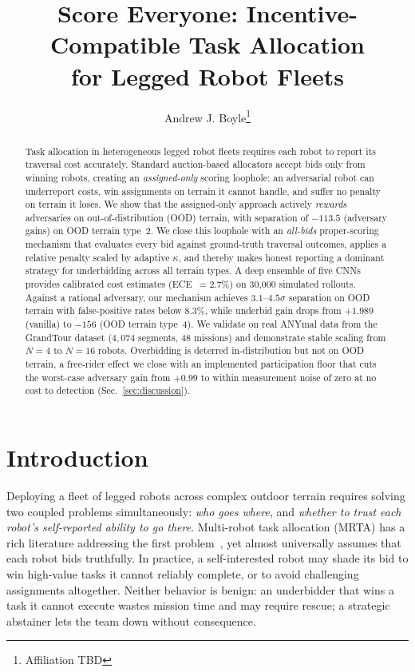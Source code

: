 \documentclass[letterpaper, 10pt, conference]{ieeeconf}
\title{\LARGE \bf Score Everyone: Incentive-Compatible Task Allocation\\for Legged Robot Fleets}
\author{Andrew J. Boyle\thanks{Affiliation TBD}}
\begin{document}
\maketitle
\thispagestyle{empty}
\pagestyle{empty}

\begin{abstract}
Task allocation in heterogeneous legged robot fleets requires each robot to
report its traversal cost accurately. Standard auction-based allocators accept
bids only from winning robots, creating an \emph{assigned-only} scoring
loophole: an adversarial robot can underreport costs, win assignments on terrain
it cannot handle, and suffer no penalty on terrain it loses.  We show that the
assigned-only approach actively \emph{rewards} adversaries on out-of-distribution
(OOD) terrain, with separation of $-113.5$ (adversary gains) on OOD terrain
type~2.  We close this loophole with an \emph{all-bids} proper-scoring mechanism
that evaluates every bid against ground-truth traversal outcomes, applies a
relative penalty scaled by adaptive $\kappa$, and thereby makes honest reporting
a dominant strategy for underbidding across all terrain types.  A deep ensemble
of five CNNs provides calibrated cost estimates (ECE~$=2.7\%$) on 30{,}000
simulated rollouts.  Against a rational adversary, our mechanism achieves
$3.1$--$4.5\sigma$ separation on OOD terrain with false-positive rates below
$8.3\%$, while underbid gain drops from $+1.989$ (vanilla) to $-156$
(OOD terrain type~4). We validate on real ANYmal data from the GrandTour
dataset ($4{,}074$ segments, 48 missions) and demonstrate stable scaling from
$N=4$ to $N=16$ robots.  Overbidding is deterred in-distribution but not on OOD
terrain, a free-rider effect we close with an implemented participation floor
that cuts the worst-case adversary gain from $+0.99$ to within measurement
noise of zero at no cost to detection (Sec.~\ref{sec:discussion}).
\end{abstract}

\section{Introduction}
\label{sec:intro}

Deploying a fleet of legged robots across complex outdoor terrain requires
solving two coupled problems simultaneously: \emph{who goes where}, and
\emph{whether to trust each robot's self-reported ability to go there}.
Multi-robot task allocation (MRTA) has a rich literature addressing the first
problem~\cite{gerkey2004formal,dias2006market,choi2009consensus}, yet almost
universally assumes that each robot bids truthfully.  In practice, a
self-interested robot may shade its bid to win high-value tasks it cannot
reliably complete, or to avoid challenging assignments altogether.  Neither
behavior is benign: an underbidder that wins a task it cannot execute wastes
mission time and may require rescue; a strategic abstainer lets the team
down without consequence.
\end{document}

